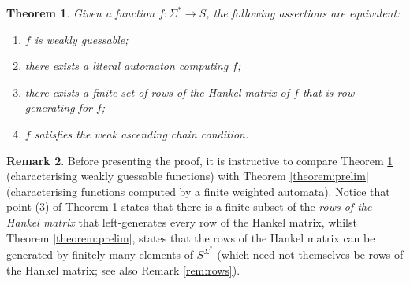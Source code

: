 \documentclass[10pt,a4paper]{amsart}
\newtheorem{thm}{Theorem}[section]
\theoremstyle{definition}
\newtheorem{rem}[thm]{Remark}
\numberwithin{equation}{section}
\numberwithin{theorem}{section}
\begin{document}
\begin{thm}
\label{prop:weakly}
Given a function $f:\Sigma^* \to S$, the following assertions are equivalent:
\begin{enumerate}
\item $f$ is weakly guessable;
\item there exists a literal automaton computing $f$;
\item there exists a finite set of rows of the Hankel matrix of $f$ that is row-generating for $f$;
\item $f$ satisfies the weak ascending chain condition.
\end{enumerate}  
\end{thm}



\begin{rem}
	\label{rem:rows2}
    Before presenting the proof, it is instructive to  compare Theorem \ref{prop:weakly} (characterising weakly guessable functions) with Theorem \ref{theorem:prelim} (characterising functions computed by a finite weighted automata). Notice that point (3) of Theorem \ref{prop:weakly} states that there is a finite subset of the \emph{rows of the Hankel matrix} that left-generates every row of the Hankel matrix, whilst Theorem \ref{theorem:prelim}, states that the rows of the Hankel matrix can be generated by finitely many elements of $S^{\Sigma^*}$ (which need not themselves be rows of the Hankel matrix; see also Remark \ref{rem:rows}).
\end{rem}
\end{document}
